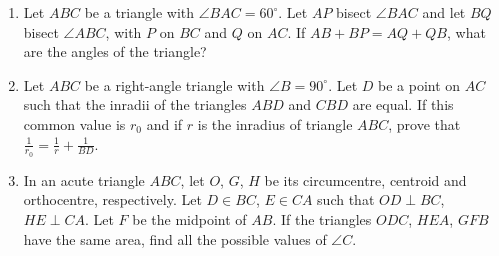\documentclass[11pt]{scrartcl}
\begin{document}
\begin{enumerate}
    \item Let $ABC$ be a triangle with $\angle BAC = 60^\circ$. Let $AP$ bisect $\angle BAC$ and let $BQ$ bisect $\angle ABC$, with $P$ on $BC$ and $Q$ on $AC$. If $AB + BP = AQ + QB$, what are the angles of the triangle?


    \item Let $ABC$ be a right-angle triangle with $\angle B = 90^\circ$. Let $D$ be a point on $AC$ such that the inradii of the triangles $ABD$ and $CBD$ are equal. If this common value is $r_0$ and if $r$ is the inradius of triangle $ABC$, prove that $\frac{1}{r_0} = \frac{1}{r} + \frac{1}{BD}$.


    \item In an acute triangle $ABC$, let $O$, $G$, $H$ be its circumcentre, centroid and orthocentre, respectively. Let $D \in BC$, $E \in CA$ such that $OD \perp BC$, $HE \perp CA$. Let $F$ be the midpoint of $AB$. If the triangles $ODC$, $HEA$, $GFB$ have the same area, find all the possible values of $\angle C$.

\end{enumerate}
\end{document}

